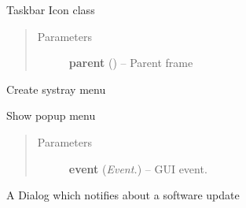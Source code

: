 \documentclass[letterpaper,10pt,english]{sphinxmanual}
\begin{document}

\begin{fulllineitems}
\label{api:wos.SysTray}
Taskbar Icon class
\begin{quote}\begin{description}
\item[{Parameters}] \leavevmode
\textbf{parent} () -- Parent frame

\end{description}\end{quote}

\begin{fulllineitems}
\label{api:wos.SysTray.CreateMenu}
Create systray menu

\end{fulllineitems}


\begin{fulllineitems}
\label{api:wos.SysTray.ShowMenu}
Show popup menu
\begin{quote}\begin{description}
\item[{Parameters}] \leavevmode
\textbf{event} (\emph{Event.}) -- GUI event.

\end{description}\end{quote}

\end{fulllineitems}


\end{fulllineitems}


\begin{fulllineitems}
\label{api:wos.UpdateDialog}
A Dialog which notifies about a software update

\end{fulllineitems}

\end{document}

